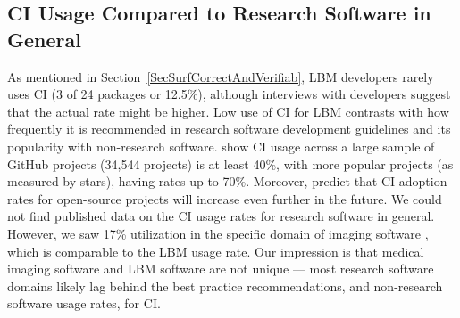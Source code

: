 \documentclass[final, 3p, times, authoryear]{elsarticle}
\begin{document}
\subsection{CI Usage Compared to Research Software in General} \label{Sec_CI}

As mentioned in Section~\ref{SecSurfCorrectAndVerifiab}, LBM developers rarely
uses CI (3 of 24 packages or 12.5\%), although interviews with developers
suggest that the actual rate might be higher. Low use of CI for LBM contrasts
with how frequently it is recommended in research software development
guidelines
\citep{BrettEtAl2021, Brown2015, ThielEtAl2020, Zadka2018, vanGompelEtAl2016}
and its popularity with non-research software. \citet{HiltonEtAl2016} show CI
usage across a large sample of GitHub projects (34,544 projects) is at least
40\%, with more popular projects (as measured by stars), having rates up to
70\%. Moreover, \citet{HiltonEtAl2016} predict that CI adoption rates for
open-source projects will increase even further in the future.  We could not
find published data on the CI usage rates for research software in general.
However, we saw 17\% utilization in the specific domain of imaging software
\citep{Dong2021}, which is comparable to the LBM usage rate. Our impression is
that medical imaging software and LBM software are not unique --- most research
software domains likely lag behind the best practice recommendations, and
non-research software usage rates, for CI.
\end{document}
